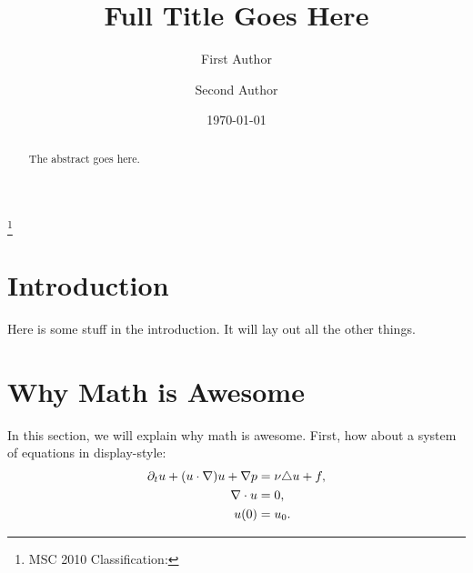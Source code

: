 

\setcounter{my_counter}{1} %

\title[Short Version of Tile]{Full Title Goes Here}

\date{\today}

\thanks{MSC 2010 Classification: }

\author{First Author}
%
\author{Second Author}
%


\thispagestyle{empty} %

\begin{abstract}
The abstract goes here. 
\end{abstract}
   
\maketitle
   
\section{\texorpdfstring{Introduction}{}}\label{sec:intro}

Here is some stuff in the introduction.  It will lay out all the other things.

\section{\texorpdfstring{Why Math is Awesome}{}}\label{sec:awesome}

In this section, we will explain why math is awesome.  First, how about a system of equations in display-style:
\begin{subequations}\label{Navier_Stokes}
\begin{align}
\label{momentum_equation}
 \partial_t u +(u\cdot\nabla)u+\nabla p &= \nu\triangle u +f,
\\
\label{MHD_div}
 \nabla\cdot u &= 0,
\\
\notag
 u(0) &= u_0.
\end{align}
\end{subequations}

